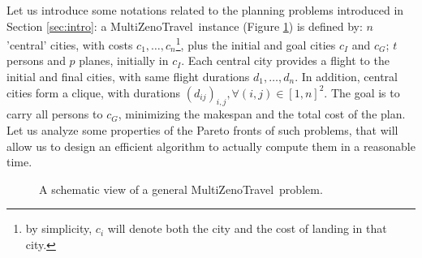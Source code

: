 \documentclass{llncs}
\def\MULTIZENO{{\sc MultiZenoTravel}}
\begin{document}
Let us introduce some notations related to the planning problems introduced in Section \ref{sec:intro}: a \MULTIZENO\ instance (Figure \ref{fig.instance}) is defined by: $n$ 'central' cities, with costs $c_1, \ldots, c_n$\footnote{by simplicity, $c_i$ will denote both the city and the cost of landing in that city.}, plus the initial and goal cities $c_I$ and $c_G$; $t$ persons and $p$ planes, initially in $c_I$. Each central city provides a flight to the initial and final cities, with same flight durations $d_1, \ldots, d_n$. In addition, central cities form a clique, with durations $(d_{ij})_{i,j}, \forall (i,j) \in [1,n]^2$. The goal is to carry all persons to $c_G$, minimizing the makespan and the total cost of the plan.
Let us analyze some properties of the Pareto fronts of such problems, that will allow us to design an efficient algorithm to actually compute them in a reasonable time.
\begin{figure}
\centering
\caption{\label{fig.instance}A schematic view of a general \MULTIZENO\ problem. }
\end{figure}
\end{document}
